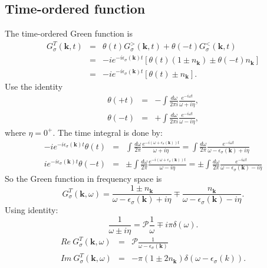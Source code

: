 \documentclass[journal=jacsat,manuscript=article]{achemso}
\begin{document}
\subsection{Time-ordered function}

The time-ordered Green function is
\begin{eqnarray}
	G_{\sigma}^{T}\left(\bm{k},t\right)\nonumber 
 	& = & \theta\left(t\right)G_{\sigma}^{>}\left(\bm{k},t\right)+\theta\left(-t\right)G_{\sigma}^{<}\left(\bm{k},t\right)\nonumber \\
 	& = & -ie^{-i\epsilon_{\sigma}\left(\bm{k}\right)t}\left[\theta\left(t\right)\left(1\pm n_{\bm{k}}\right)\pm\theta\left(-t\right)n_{\bm{k}}\right]\nonumber \\
 	& = & -ie^{-i\epsilon_{\sigma}\left(\bm{k}\right)t}\left[\theta\left(t\right)\pm n_{\bm{k}}\right].
\end{eqnarray}
Use the identity
\begin{eqnarray}
\theta\left(+t\right) & = & -\int\frac{d\omega}{2\pi i}\frac{e^{-i\omega t}}{\omega+i\eta},\\
\theta\left(-t\right) & = & +\int\frac{d\omega}{2\pi i}\frac{e^{-i\omega t}}{\omega-i\eta},
\end{eqnarray}
where $\eta=0^{+}$. The time integral is done by:
\begin{eqnarray}
	-ie^{-i\epsilon_{\sigma}\left(\bm{k}\right)t}\theta\left(t\right)
 	& = & \int\frac{d\omega}{2\pi}\frac{e^{-i\left(\omega+\epsilon_{\sigma}\left(\bm{k}\right)\right)t}}{\omega+i\eta}
 	=\int\frac{d\omega}{2\pi}\frac{e^{-i\omega t}}{\omega-\epsilon_{\sigma}\left(\bm{k}\right)+i\eta}\\
	ie^{-i\epsilon_{\sigma}\left(\bm{k}\right)t}\theta\left(-t\right)
 	& = & \pm\int\frac{d\omega}{2\pi}\frac{e^{-i\left(\omega+\epsilon_{\sigma}\left(\bm{k}\right)\right)t}}{\omega-i\eta}
 	=\pm\int\frac{d\omega}{2\pi}\frac{e^{-i\omega t}}{\omega-\epsilon_{\sigma}\left(\bm{k}\right)-i\eta}
\end{eqnarray}
So the Green function in frequency space is
\begin{equation}
	G_{\sigma}^{T}\left(\bm{k},\omega\right)=\frac{1\pm n_{\bm{k}}}{\omega-\epsilon_{\sigma}\left(\bm{k}\right)+i\eta}\mp\frac{n_{\bm{k}}}{\omega-\epsilon_{\sigma}\left(\bm{k}\right)-i\eta}.
\end{equation}
Using identity:
\begin{equation}
	\frac{1}{\omega\pm i\eta}=\mathcal{P}\frac{1}{\omega}\mp i\pi\delta\left(\omega\right).
\end{equation}
\begin{eqnarray}
	Re\ G_{\sigma}^{T}\left(\bm{k},\omega\right) & = & \mathcal{P}\frac{1}{\omega-\epsilon_{\sigma}\left(\bm{k}\right)}\\
	Im\ G_{\sigma}^{T}\left(\bm{k},\omega\right) & = & -\pi\left(1\pm2n_{\bm{k}}\right)\delta\left(\omega-\epsilon_{\sigma}\left(k\right)\right).
\end{eqnarray}
\end{document}

